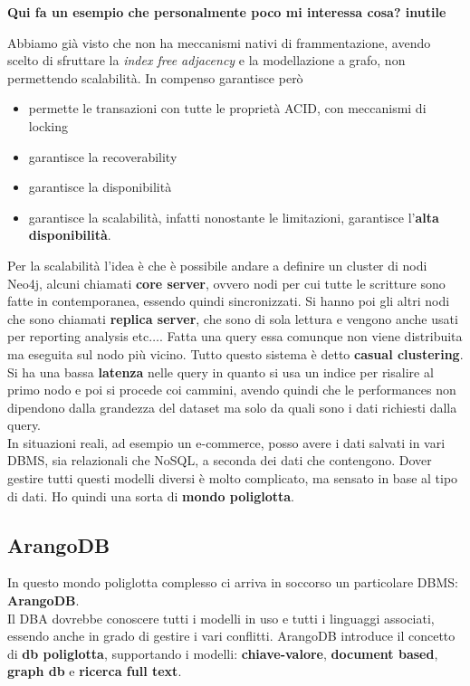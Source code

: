 \textbf{Qui fa un esempio che personalmente poco mi interessa cosa? inutile}

Abbiamo già visto che non ha meccanismi nativi di frammentazione, avendo scelto di sfruttare la \textit{index free adjacency} e la modellazione a grafo, non permettendo scalabilità. In compenso garantisce però
\begin{itemize}
  \item permette le transazioni con tutte le proprietà ACID, con meccanismi di locking
  \item garantisce la recoverability
  \item garantisce la disponibilità
  \item garantisce la scalabilità, infatti nonostante le limitazioni, garantisce l'\textbf{alta disponibilità}.
\end{itemize}
Per la scalabilità l'idea è che è possibile andare a definire un cluster di nodi Neo4j, alcuni chiamati \textbf{core server}, ovvero nodi per cui tutte le scritture sono fatte in contemporanea, essendo quindi sincronizzati. Si hanno poi gli altri nodi che sono chiamati \textbf{replica server}, che sono di sola lettura e vengono anche usati per reporting analysis etc$\ldots$. Fatta una query essa comunque non viene distribuita ma eseguita sul nodo più vicino. Tutto questo sistema è detto \textbf{casual clustering}.\\ 
Si ha una bassa \textbf{latenza} nelle query in quanto si usa un indice per risalire al primo nodo e poi si procede coi cammini, avendo quindi che le performances non dipendono dalla grandezza del dataset ma solo da quali sono i dati richiesti dalla query.\\

In situazioni reali, ad esempio un e-commerce, posso avere i dati salvati in vari DBMS, sia relazionali che NoSQL, a seconda dei dati che contengono. Dover gestire tutti questi modelli diversi è molto complicato, ma sensato in base al tipo di dati. Ho quindi una sorta di \textbf{mondo poliglotta}. 
\subsection{ArangoDB}
In questo mondo poliglotta complesso ci arriva in soccorso un particolare DBMS: \textbf{ArangoDB}.\\ 
Il DBA dovrebbe conoscere tutti i modelli in uso e tutti i linguaggi associati, essendo anche in grado di gestire i vari conflitti. ArangoDB introduce il concetto di \textbf{db poliglotta}, supportando i modelli: \textbf{chiave-valore}, \textbf{document based}, \textbf{graph db} e \textbf{ricerca full text}.

